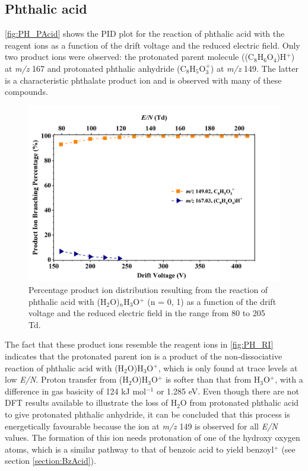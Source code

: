 \subsection{Phthalic acid}



\autoref{fig:PH_PAcid} shows the PID plot for the reaction of phthalic acid with the reagent ions as a function of the drift voltage and the reduced electric field. 
%
Only two product ions were observed: the protonated parent molecule  ((C$_8$H$_6$O$_4$)H$^+$)  at \textit{m/z} 167 and  protonated phthalic anhydride (C$_8$H$_{5}$O$_3^+$) at \textit{m/z} 149.
%
The latter is a characteristic phthalate product ion and is observed with many of these compounds.

    \begin{figure}[htb]
    \centering
    \includegraphics[height=0.35\textheight]{pics/Pacid-BR.png}
    \caption{Percentage product ion distribution resulting from the reaction of phthalic acid with (H$_2$O)$_n$H$_3$O$^+$ (n = 0, 1) as a function of the drift voltage and the reduced electric field in the range from 80 to 205 Td.}
    \label{fig:PH_PAcid}
    \end{figure}


The fact that these product ions resemble the reagent ions in \autoref{fig:PH_RI} indicates that the protonated parent ion is a product of the non-dissociative reaction of phthalic acid with (H$_2$O)H$_3$O$^+$, which is only found at trace levels at low \textit{E/N}.
%
Proton transfer from (H$_2$O)H$_3$O$^+$ is  softer  than that from H$_3$O$^+$, with a difference in gas basicity  of 124 kJ mol$^{-1}$ or 1.285 eV.
%
Even though there are not DFT results available to illustrate the loss of H$_2$O from protonated phthalic acid to give protonated phthalic anhydride, it can be concluded that this process is energetically favourable because the ion at \textit{m/z} 149 is observed for all \textit{E/N} values. 
%
The formation of this ion needs  protonation of one of the hydroxy oxygen atoms, which is a similar pathway to that of benzoic acid to yield benzoyl$^+$ (see section \ref{section:BzAcid}). %









